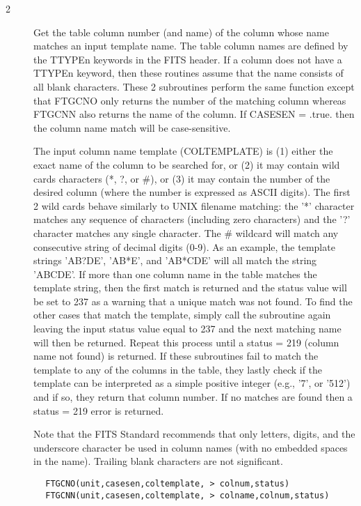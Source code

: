 \documentclass[11pt]{book}
\begin{document}
\begin{description}
\item[2 ] Get the table column number (and name) of the column whose name
matches an input template name.  The table column names are defined by
the TTYPEn keywords in the FITS header.  If a column does not have a
TTYPEn keyword, then these routines assume that the name consists of
all blank characters.  These 2 subroutines perform the same function
except that FTGCNO only returns the number of the matching column whereas
FTGCNN also returns the name of the column.  If CASESEN = .true. then
the column name match will be case-sensitive.

The input column name template (COLTEMPLATE) is (1) either the exact
name of the column to be searched for, or (2) it may contain wild cards
characters (*, ?, or \#), or (3) it may contain the number of the desired
column (where the number is expressed as ASCII digits).  The first 2 wild
cards behave similarly to UNIX filename matching:  the '*' character matches
any sequence of characters (including zero characters) and the '?'
character matches any single character.  The \# wildcard will match
any consecutive string of decimal digits (0-9).  As an example, the template
strings 'AB?DE', 'AB*E', and 'AB*CDE' will all match the string
'ABCDE'.  If more than one column name in the table matches the
template string, then the first match is returned and the status value
will be set to 237 as a warning that a unique match was not found.  To
find the other cases that match the template, simply call the
subroutine again leaving the input status value equal to  237 and the
next matching name will then be returned.  Repeat this process until a
status = 219 (column name not found) is returned.  If these subroutines
fail to match the template to any of the columns in the table, they
lastly check if the template can be interpreted as a simple positive
integer (e.g., '7', or '512') and if so, they return that column
number.  If no matches are found then a status = 219 error is
returned.

Note that the FITS Standard recommends that only letters, digits, and
the underscore character be used in column names (with no embedded
spaces in the name).  Trailing blank characters are not significant.
\end{description}

\begin{verbatim}
        FTGCNO(unit,casesen,coltemplate, > colnum,status)
        FTGCNN(unit,casesen,coltemplate, > colname,colnum,status)
\end{verbatim}
\end{document}
